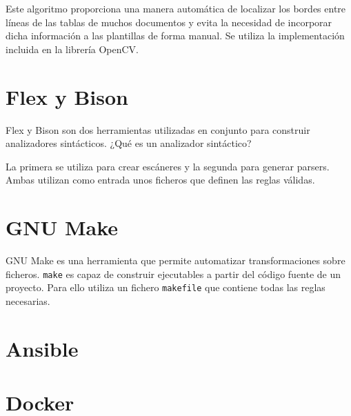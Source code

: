 Este algoritmo proporciona una manera automática de localizar los bordes entre líneas de las tablas de muchos documentos y evita la necesidad de incorporar dicha información a las plantillas de forma manual. Se utiliza la implementación incluida en la librería OpenCV.

\section{Flex y Bison}

Flex y Bison son dos herramientas utilizadas en conjunto para construir analizadores sintácticos. ¿Qué es un analizador sintáctico?

La primera se utiliza para crear escáneres y la segunda para generar parsers. Ambas utilizan como entrada unos ficheros que definen las reglas válidas.

\section{GNU Make}

GNU Make es una herramienta que permite automatizar transformaciones sobre ficheros. \verb|make| es capaz de construir ejecutables a partir del código fuente de un proyecto. Para ello utiliza un fichero \verb|makefile| que contiene todas las reglas necesarias.

\section{Ansible}

\section{Docker}

